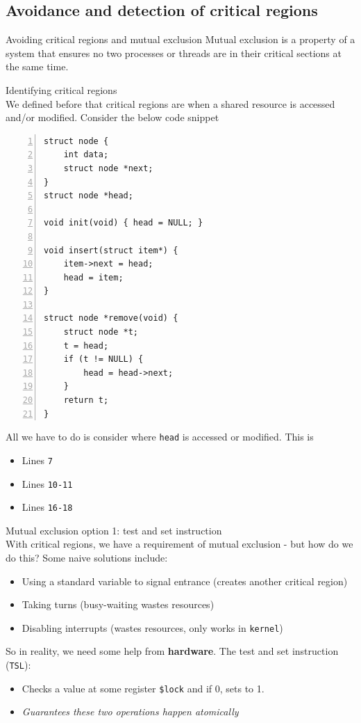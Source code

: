 \documentclass[journal, letterpaper]{IEEEtran}
\begin{document}
\subsection{Avoidance and detection of critical regions}
\begin{aside}{Avoiding critical regions and mutual exclusion}
    Mutual exclusion is a property of a system that ensures no two processes or threads are in their critical sections at the same time.
\end{aside}
\begin{example}{Identifying critical regions} \\
    We defined before that critical regions are when a shared resource is accessed and/or modified. Consider the below code snippet
\begin{Verbatim}[numbers=left, numbersep=2mm, frame=single]
struct node {
    int data;
    struct node *next;
}
struct node *head;

void init(void) { head = NULL; }

void insert(struct item*) {
    item->next = head;
    head = item;
}

struct node *remove(void) {
    struct node *t;
    t = head;
    if (t != NULL) {
        head = head->next;
    }
    return t;
}
\end{Verbatim}
All we have to do is consider where \verb|head| is accessed or modified. This is
\begin{itemize}
    \item Lines \verb|7|
    \item Lines \verb|10-11|
    \item Lines \verb|16-18|
\end{itemize}
\end{example}
\begin{theory}{Mutual exclusion option 1: test and set instruction} \\
    With critical regions, we have a requirement of mutual exclusion - but how do we do this? Some naive solutions include:
    \begin{itemize}
        \item Using a standard variable to signal entrance (creates another critical region)
        \item Taking turns (busy-waiting wastes resources)
        \item Disabling interrupts (wastes resources, only works in \verb|kernel|)
    \end{itemize}
    So in reality, we need some help from \textbf{hardware}. The test and set instruction (\verb|TSL|):
    \begin{itemize}
        \item Checks a value at some register \verb|$lock| and if 0, sets to 1.
        \item \textit{Guarantees these two operations happen atomically}
    \end{itemize}
\end{theory}
\end{document}
